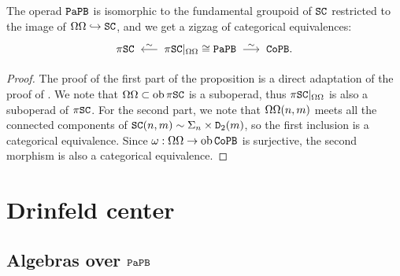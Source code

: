 \begin{theorem} \label{sw.thm.model-sc}
  The operad $\mathtt{PaPB}$ is isomorphic to the fundamental groupoid of $\mathtt{SC}$ restricted to the image of ${\Omega\Omega} \hookrightarrow \mathtt{SC}$, and we get a zigzag of categorical equivalences:
  \[ \pi \SC \qiso* \pi \SC|_{\tMagma} \cong \PaPB \qiso \CoPB. \]
\end{theorem}
\begin{proof}
  The proof of the first part of the proposition is a direct adaptation of the proof of \cite[Proposition I.6.2.2(b)]{Fresse2017}.
We note that ${\Omega\Omega} \subset \operatorname{ob} \pi \mathtt{SC}$ is a suboperad, thus $\pi \mathtt{SC}|_{{\Omega\Omega}}$ is also a suboperad of $\pi \mathtt{SC}$.
For the second part, we note that ${\Omega\Omega}(n,m)$ meets all the connected components of $\mathtt{SC}(n,m) \sim \Sigma_{n} \times \mathtt{D}_{2}(m)$, so the first inclusion is a categorical equivalence.
Since $\omega : {\Omega\Omega} \to \operatorname{ob} \mathtt{CoPB}$ is surjective, the second morphism is also a categorical equivalence.
\end{proof}

\section{Drinfeld center}
\label{sw.sec.drinfeld-center}

\subsection{Algebras over \texorpdfstring{$\mathtt{PaPB}$}{PaPB}}
\label{sw.sec.algebras-over-papb}


